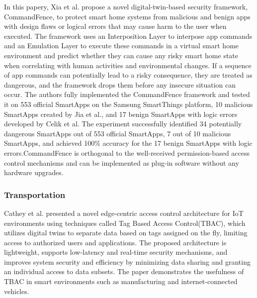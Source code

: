 In\cite{xiaoCommandFenceNovelDigitalTwinBased2022} this papery,  Xia et al. propose a novel digital-twin-based security framework, CommandFence, to protect smart home systems from malicious and benign apps with design flaws or logical errors that may cause harm to the user when executed. The framework uses an Interposition Layer to interpose app commands and an Emulation Layer to execute these commands in a virtual smart home environment and predict whether they can cause any risky smart home state when correlating with human activities and environmental changes. If a sequence of app commands can potentially lead to a risky consequence, they are treated as dangerous, and the framework drops them before any insecure situation can occur. The authors fully implemented the CommandFence framework and tested it on 553 official SmartApps on the Samsung SmartThings platform, 10 malicious SmartApps created by Jia et al., and 17 benign SmartApps with logic errors developed by Celik et al. The experiment successfully identified 34 potentially dangerous SmartApps out of 553 official SmartApps, 7 out of 10 malicious SmartApps, and achieved 100\% accuracy for the 17 benign SmartApps with logic errors.CommandFence is orthogonal to the well-received permission-based access control mechanisms and can be implemented as plug-in software without any hardware upgrades. 

\subsubsection{Transportation}

Cathey et al.\cite{glenandbensonjamesandguptamaanakandsandhuravicatheyEdgeCentricSecure2021} presented a novel edge-centric access control architecture for IoT environments using techniques called Tag Based Access Control(TBAC), which utilizes digital twins to separate data based on tags assigned on the fly, limiting access to authorized users and applications. The proposed architecture is lightweight, supports low-latency and real-time security mechanisms, and improves system security and efficiency by minimizing data sharing and granting an individual access to data subsets. The paper demonstrates the usefulness of TBAC in smart environments such as manufacturing and internet-connected vehicles.

